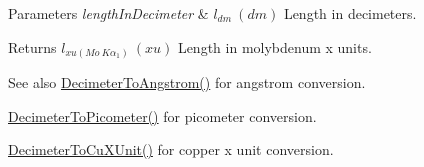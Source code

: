\begin{DoxyParams}{Parameters}
{\em length\+In\+Decimeter} & $ l_{dm}\ (dm)$ Length in decimeters. \\
\hline
\end{DoxyParams}
\begin{DoxyReturn}{Returns}
$ l_{xu(Mo\ K\alpha_1)}\ (xu)$ Length in molybdenum x units. 
\end{DoxyReturn}
\begin{DoxySeeAlso}{See also}
\mbox{\hyperlink{group___e_g_x_math-_conversions-_length_conversions-_decimeter-_non-_s_i_gaffa5876e4f15bc859c369e8bfb9e4183}{Decimeter\+To\+Angstrom()}} for angstrom conversion. 

\mbox{\hyperlink{group___e_g_x_math-_conversions-_length_conversions-_decimeter-_s_i_gaac5fa4b7b538abe2d19f33e131e9bbde}{Decimeter\+To\+Picometer()}} for picometer conversion. 

\mbox{\hyperlink{group___e_g_x_math-_conversions-_length_conversions-_decimeter-_non-_s_i_gab595b2398e8e838922b4591308466e87}{Decimeter\+To\+Cu\+X\+Unit()}} for copper x unit conversion. 
\end{DoxySeeAlso}
